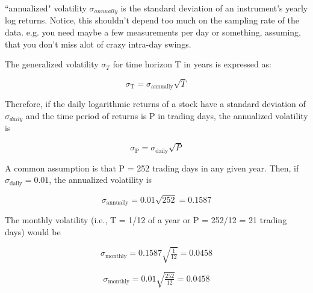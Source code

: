 \documentclass[10pt,landscape]{article}
\begin{document}
\begin{multicols}{3}
``annualized" volatility $\sigma_{annually}$ is the standard deviation of an instrument's yearly log returns. Notice, this shouldn't depend too much on the sampling rate of the data. e.g. you need maybe a few measurements per day or something, assuming, that you don't miss alot of crazy intra-day swings.

\vspace{0.15cm}

The generalized volatility $\sigma_{T}$ for time horizon T in years is expressed as:

\vspace{0.15cm}

$$\sigma_\text{T} = \sigma_\text{annually} \sqrt{T}$$

\vspace{0.15cm}

Therefore, if the daily logarithmic returns of a stock have a standard deviation of $\sigma_{daily}$ and the time period of returns is P in trading days, the annualized volatility is

\vspace{0.15cm}

$$\sigma_\text{P} = \sigma_\text{daily} \sqrt{P}$$

\vspace{0.15cm}

A common assumption is that P = 252 trading days in any given year. Then, if $\sigma_\text{daily} = 0.01$, the annualized volatility is

\vspace{0.15cm}

$$\sigma_\text{annually} = 0.01 \sqrt{252} = 0.1587$$

\vspace{0.15cm}

The monthly volatility (i.e., T = 1/12 of a year or P = 252/12 = 21 trading days) would be

\vspace{0.15cm}

$$\sigma_\text{monthly} = 0.1587 \sqrt{\tfrac{1}{12}} = 0.0458$$

\vspace{0.15cm}

$$\sigma_\text{monthly} = 0.01 \sqrt{\tfrac{252}{12}} = 0.0458$$

\vspace{0.15cm}


\end{multicols}
\end{document}
